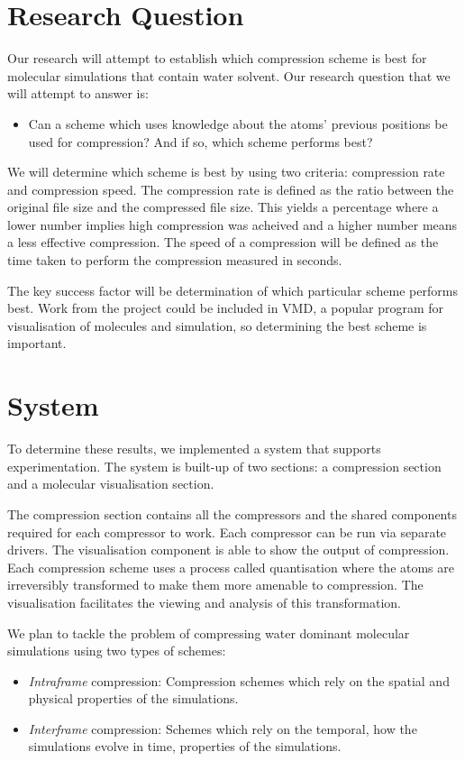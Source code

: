 \documentclass[a4paper,11pt]{report}
\begin{document}
\section{Research Question}

Our research will attempt to establish which compression scheme is best for molecular simulations that contain water solvent. Our research question that we will attempt to answer is:

\begin{itemize}
 \item Can a scheme which uses knowledge about the atoms' previous positions be used for compression? And if so, which scheme performs best?
\end{itemize}


We will determine which scheme is best by using two criteria: compression rate and compression speed. The compression rate is defined as the ratio between the original file size and the compressed file size. This yields a percentage where a lower number implies high compression was acheived and a higher number means a less effective compression. The speed of a compression will be defined as the time taken to perform the compression measured in seconds.

The key success factor will be determination of which particular scheme performs best. Work from the project could be included in VMD\cite{vmd}, a popular program for visualisation of molecules and simulation, so determining the best scheme is important.
 
\section{System}

To determine these results, we implemented a system that supports experimentation. The system is built-up of two sections: a compression section and a molecular visualisation section. 

The compression section contains all the compressors and the shared components required for each compressor to work. Each compressor can be run via separate drivers. The visualisation component is able to show the output of compression. Each compression scheme uses a process called quantisation where the atoms are irreversibly transformed to make them more amenable to compression. The visualisation facilitates the viewing and analysis of this transformation. 

We plan to tackle the problem of compressing water dominant molecular simulations using two types of schemes: 
\begin{itemize}
 \item \emph{Intraframe} compression: Compression schemes which rely on the spatial and physical properties of the simulations.
 \item \emph{Interframe} compression: Schemes which rely on the temporal, how the simulations evolve in time, properties of the simulations. 
\end{itemize}
\end{document}
